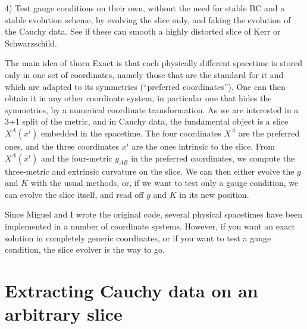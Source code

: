 4) Test gauge conditions on their own, without the need for stable BC
and a stable evolution scheme, by evolving the slice only, and faking
the evolution of the Cauchy data. See if these can smooth a highly
distorted slice of Kerr or Schwarzschild.

The main idea of thorn Exact is that each physically different
spacetime is stored only in one set of coordinates, namely those that
are the standard for it and which are adapted to its symmetries
(``preferred coordinates''). One can then obtain it in any other
coordinate system, in particular one that hides the symmetries, by a
numerical coordinate transformation. As we are interested in a 3+1
split of the metric, and in Cauchy data, the fundamental object is a
slice $X^A(x^i)$ embedded in the spacetime. The four coordinates $X^A$
are the preferred ones, and the three coordinates $x^i$ are the ones
intrinsic to the slice.  From $X^A(x^i)$ and the four-metric $g_{AB}$
in the preferred coordinates, we compute the three-metric and
extrinsic curvature on the slice. We can then either evolve the $g$
and $K$ with the usual methods, or, if we want to test only a gauge
condition, we can evolve the slice itself, and read off $g$ and $K$ in
its new position. 

Since Miguel and I wrote the original code, several physical
spacetimes have been implemented in a number of coordinate
systems. However, if you want an exact solution in completely generic
coordinates, or if you want to test a gauge condition, the slice
evolver is the way to go.


\section{Extracting Cauchy data on an arbitrary slice}


